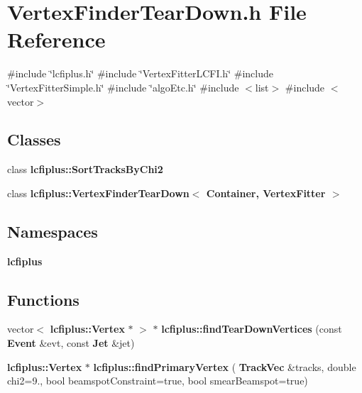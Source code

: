 \section{Vertex\+Finder\+Tear\+Down.\+h File Reference}
\label{VertexFinderTearDown_8h}
{\ttfamily \#include \char`\"{}lcfiplus.\+h\char`\"{}}\newline
{\ttfamily \#include \char`\"{}Vertex\+Fitter\+L\+C\+F\+I.\+h\char`\"{}}\newline
{\ttfamily \#include \char`\"{}Vertex\+Fitter\+Simple.\+h\char`\"{}}\newline
{\ttfamily \#include \char`\"{}algo\+Etc.\+h\char`\"{}}\newline
{\ttfamily \#include $<$list$>$}\newline
{\ttfamily \#include $<$vector$>$}\newline
\subsection*{Classes}
\begin{DoxyCompactItemize}
\item 
class \textbf{ lcfiplus\+::\+Sort\+Tracks\+By\+Chi2}
\item 
class \textbf{ lcfiplus\+::\+Vertex\+Finder\+Tear\+Down$<$ Container, Vertex\+Fitter $>$}
\end{DoxyCompactItemize}
\subsection*{Namespaces}
\begin{DoxyCompactItemize}
\item 
 \textbf{ lcfiplus}
\end{DoxyCompactItemize}
\subsection*{Functions}
\begin{DoxyCompactItemize}
\item 
vector$<$ \textbf{ lcfiplus\+::\+Vertex} $\ast$ $>$ $\ast$ \textbf{ lcfiplus\+::find\+Tear\+Down\+Vertices} (const \textbf{ Event} \&evt, const \textbf{ Jet} \&jet)
\item 
\textbf{ lcfiplus\+::\+Vertex} $\ast$ \textbf{ lcfiplus\+::find\+Primary\+Vertex} (\textbf{ Track\+Vec} \&tracks, double chi2=9., bool beamspot\+Constraint=true, bool smear\+Beamspot=true)
\end{DoxyCompactItemize}
